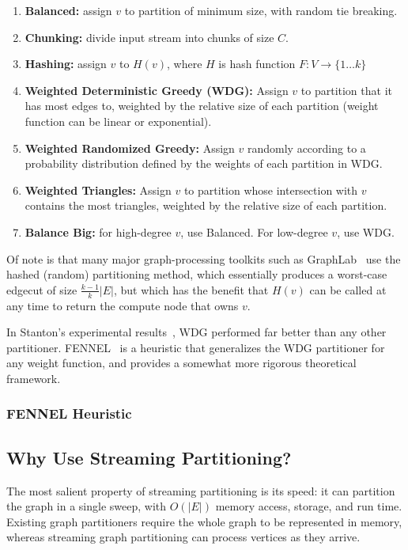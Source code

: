 \documentclass[11pt]{article}
\begin{document}
\begin{enumerate}
\item \textbf{Balanced:} assign $v$ to partition of minimum size, with random tie breaking.
\item \textbf{Chunking:} divide input stream into chunks of size $C$.
\item \textbf{Hashing:} assign $v$ to $H(v)$, where $H$ is hash function $F:V\to\{1\dots k\}$
\item \textbf{Weighted Deterministic Greedy (WDG):} Assign $v$ to partition that it has most edges to, weighted by the relative size of each partition (weight function can be linear or exponential).
\item \textbf{Weighted Randomized Greedy:} Assign $v$ randomly according to a probability distribution defined by the weights of each partition in WDG.
\item \textbf{Weighted Triangles:} Assign $v$ to partition whose intersection with $v$ contains the most triangles, weighted by the relative size of each partition.
\item \textbf{Balance Big:} for high-degree $v$, use Balanced. For low-degree $v$, use WDG. 
\end{enumerate}

Of note is that many major graph-processing toolkits such as GraphLab~\cite{Low:2012:DGF:2212351.2212354} use the hashed (random) partitioning method, which essentially produces a worst-case edgecut of size $\frac{k-1}{k}|E|$, but which has the benefit that $H(v)$ can be called at any time to return the compute node that owns $v$. 

In Stanton's experimental results~\cite{Stanton:2012:SGP:2339530.2339722}, WDG performed far better than any other partitioner. FENNEL~\cite{tsourakakis2012fennel} is a heuristic that generalizes the WDG partitioner for any weight function, and provides a somewhat more rigorous theoretical framework. 

\subsubsection{FENNEL Heuristic}

\subsection{Why Use Streaming Partitioning?}
The most salient property of streaming partitioning is its speed: it can partition the graph in a single sweep, with $O(|E|)$ memory access, storage, and run time. Existing graph partitioners require the whole graph to be represented in memory, whereas streaming graph partitioning can process vertices as they arrive.
\end{document}
